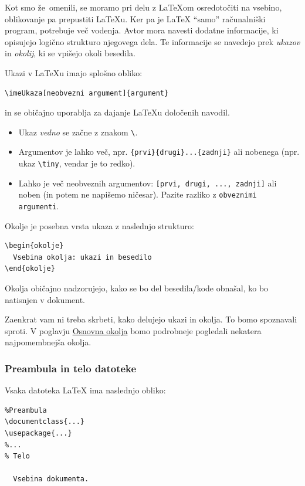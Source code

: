 Kot smo že~omenili, se moramo pri delu z LaTeXom osredotočiti na vsebino, oblikovanje pa prepustiti LaTeXu.
Ker pa je LaTeX ``samo'' računalniški program, potrebuje
več vodenja.
Avtor mora navesti dodatne informacije, ki opisujejo logično strukturo njegovega dela.
Te informacije se navedejo prek \textit{ukazov} in \textit{okolij}, ki se vpišejo okoli besedila.

Ukazi v LaTeXu imajo splošno obliko:

\begin{verbatim}
\imeUkaza[neobvezni argument]{argument}
\end{verbatim}

in se običajno uporablja za dajanje LaTeXu določenih navodil.

\begin{itemize}
\item Ukaz \textit{vedno} se začne z znakom \texttt{{\textbackslash}}.
\item Argumentov je lahko več, npr. \texttt{\{prvi\}\{drugi\}...\{zadnji\}} ali  nobenega (npr. ukaz \texttt{{\textbackslash}tiny}, vendar je to redko).
\item Lahko je več neobveznih argumentov: \texttt{[prvi, drugi, ..., zadnji]}  ali noben (in potem ne napišemo ničesar). Pazite razliko z \texttt{obveznimi argumenti}.
\end{itemize}

Okolje je posebna vrsta ukaza z naslednjo strukturo:

\begin{verbatim}
\begin{okolje}
  Vsebina okolja: ukazi in besedilo
\end{okolje}
\end{verbatim}

Okolja običajno nadzorujejo, kako se bo del besedila/kode obnašal, ko bo natisnjen v dokument.

Zaenkrat vam ni treba skrbeti, kako delujejo ukazi in okolja.
To bomo spoznavali sproti.
V poglavju \href{/latexosnovnaokolja}{Osnovna okolja}  bomo podrobneje pogledali nekatera najpomembnejša okolja.

\subsubsection{Preambula in telo datoteke}\label{latexUvod_preambulaTelo}

Vsaka datoteka LaTeX ima naslednjo obliko:

\begin{verbatim}
%Preambula
\documentclass{...}
\usepackage{...}
%... 
% Telo

  Vsebina dokumenta.

\end{verbatim}

